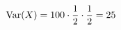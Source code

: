 \documentclass[preview]{standalone}
\begin{document}
\begin{align*}
\special{dvisvgm:raw <g id='unique000'>}\operatorname{Var}(X)=100\cdot\frac12\cdot\frac12=25\special{dvisvgm:raw </g>}
\end{align*}
\end{document}
